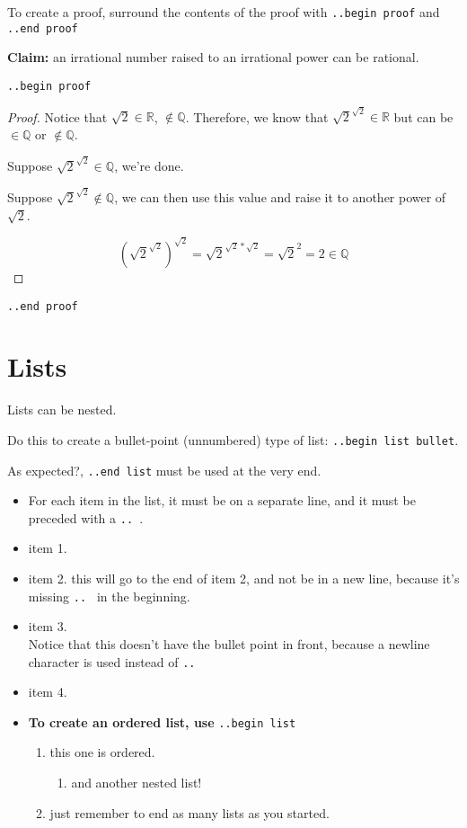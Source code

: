 \documentclass[12pt]{article}
\begin{document}
\begin{flushleft}
To create a proof, surround the contents of the proof with \verb|..begin proof| and \verb|..end proof|

\bigskip

\textbf{Claim:} an irrational number raised to an irrational power can be rational.

\medskip
\verb|..begin proof|
\begin{proof}

Notice that $\sqrt{2} \in \mathbb{R}$, $\notin \mathbb{Q}$. Therefore, we know that $\sqrt{2}^{\sqrt{2}} \in \mathbb{R}$ but can be $\in \mathbb{Q}$ or $\notin \mathbb{Q}$.

Suppose $\sqrt{2}^{\sqrt{2}} \in \mathbb{Q}$, we're done.

Suppose $\sqrt{2}^{\sqrt{2}} \notin \mathbb{Q}$, we can then use this value and raise it to another power of $\sqrt{2}$.

\[ (\sqrt{2}^{\sqrt{2}})^{\sqrt{2}} = \sqrt{2}^{\sqrt{2} * \sqrt{2}} = \sqrt{2}^2 = 2 \in \mathbb{Q} \]
\end{proof}
\verb|..end proof|

\section{Lists}

Lists can be nested.

Do this to create a bullet-point (unnumbered) type of list: \verb|..begin list bullet|.

As expected?, \verb|..end list| must be used at the very end.
\begin{itemize}
    \item For each item in the list, it must be on a separate line, and it must be preceded with a \verb|.. |.
    \item item 1.
    \item item 2.
    this will go to the end of item 2, and not be in a new line, because it's missing \verb|.. | in the beginning.
    \item item 3.
    \\ Notice that this doesn't have the bullet point in front, because a newline character is used instead of \verb|.. |
    \item item 4.
    \item \textbf{To create an ordered list, use} \verb|..begin list|
    \begin{enumerate}
        \item this one is ordered.
        \begin{enumerate}
            \item and another nested list!
        \end{enumerate}
        \item just remember to end as many lists as you started.
    \end{enumerate}
    

\end{itemize}
\end{flushleft}
\end{document}
